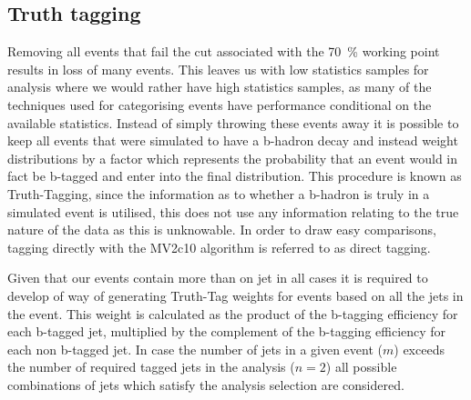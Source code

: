 \subsection{Truth tagging}

Removing all events that fail the cut associated with the 70~\% working point
results in loss of many events. This leaves us with low statistics samples for
analysis where we would rather have high statistics samples, as many of the
techniques used for categorising events have performance conditional on the
available statistics. Instead of simply throwing these events away it is
possible to keep all events that were simulated to have a b-hadron decay and
instead weight distributions by a factor which represents the probability that
an event would in fact be b-tagged and enter into the final distribution. This
procedure is known as Truth-Tagging, since the information as to whether a
b-hadron is truly in a simulated event is utilised, this does not use any
information relating to the true nature of the data as this is unknowable. In
order to draw easy comparisons, tagging directly with the MV2c10 algorithm is
referred to as direct tagging.

Given that our events contain more than on jet in all cases it is required to
develop of way of generating Truth-Tag weights for events based on all the jets
in the event. This weight is calculated as the product of the b-tagging
efficiency for each b-tagged jet, multiplied by the complement of the b-tagging
efficiency for each non b-tagged jet. In case the number of jets in a given
event ($m$) exceeds the number of required tagged jets in the analysis ($n=2$)
all possible combinations of jets which satisfy the analysis selection are
considered.

